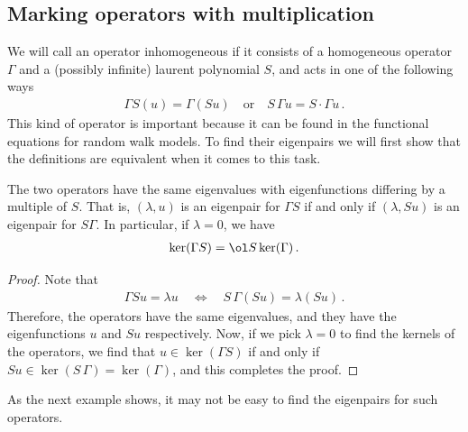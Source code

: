 \subsection{Marking operators with multiplication}
We will call an operator inhomogeneous if it consists of a homogeneous operator $\Gamma$ and a (possibly infinite) laurent polynomial $S$, and acts in one of the following ways
 \begin{align}
	\Gamma S(u) = \Gamma(Su)\quad\text{or}\quad S\,\Gamma u = S\cdot \Gamma u\,.
 \end{align}
This kind of operator is important because it can be found in the functional equations for random walk models. To find their eigenpairs we will first show that the definitions are equivalent when it comes to this task.
\begin{prop} The two operators have the same eigenvalues with eigenfunctions differing by a multiple of $S$. That is, $(\lambda,u)$ is an eigenpair for $\Gamma S$ if and only if $(\lambda, Su)$ is an eigenpair for $S \Gamma$. In particular, if $\lambda = 0$, we have
\begin{align}
	\ker(\Gamma S) = \ol S \ker(\Gamma)\,.
\end{align}
\end{prop}
\begin{proof} Note that
\begin{align}
	\Gamma Su = \lambda u \quad \Longleftrightarrow \quad S\,\Gamma (Su) = \lambda (Su)\,.
\end{align}
Therefore, the operators have the same eigenvalues, and they have the eigenfunctions $u$ and $Su$ respectively. Now, if we pick $\lambda = 0$ to find the kernels of the operators, we find that $u \in \ker(\Gamma S)$ if and only if $Su \in \ker(S\,\Gamma) = \ker(\Gamma)$, and this completes the proof.
\end{proof}
As the next example shows, it may not be easy to find the eigenpairs for such operators.
